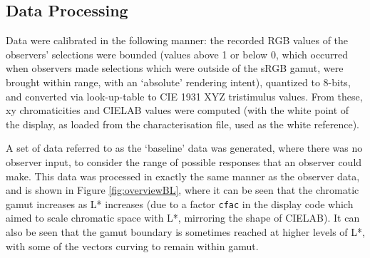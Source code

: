 

\subsection{Data Processing}

Data were calibrated in the following manner: the recorded RGB values of the observers' selections were bounded (values above 1 or below 0, which occurred when observers made selections which were outside of the sRGB gamut, were brought within range, with an `absolute' rendering intent), quantized to 8-bits, and converted via look-up-table to \gls{CIE} 1931 XYZ tristimulus values. From these, xy chromaticities and CIELAB values were computed (with the white point of the display, as loaded from the characterisation file, used as the white reference).

A set of data referred to as the `baseline' data was generated, where there was no observer input, to consider the range of possible responses that an observer could make. This data was processed in exactly the same manner as the observer data, and is shown in Figure \ref{fig:overviewBL}, where it can be seen that the chromatic gamut increases as L* increases (due to a factor \texttt{cfac} in the display code which aimed to scale chromatic space with L*, mirroring the shape of CIELAB). It can also be seen that the gamut boundary is sometimes reached at higher levels of L*, with some of the vectors curving to remain within gamut.

